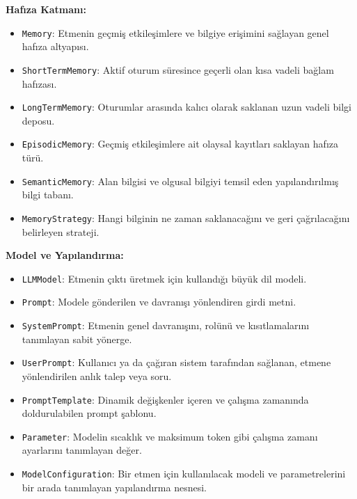 \documentclass[10pt, a4paper, twocolumn]{article}
\begin{document}
\textbf{Hafıza Katmanı:}
\begin{itemize}
    \item \texttt{Memory}: Etmenin geçmiş etkileşimlere ve bilgiye erişimini sağlayan genel hafıza altyapısı.
    \item \texttt{ShortTermMemory}: Aktif oturum süresince geçerli olan kısa vadeli bağlam hafızası.
    \item \texttt{LongTermMemory}: Oturumlar arasında kalıcı olarak saklanan uzun vadeli bilgi deposu.
    \item \texttt{EpisodicMemory}: Geçmiş etkileşimlere ait olaysal kayıtları saklayan hafıza türü.
    \item \texttt{SemanticMemory}: Alan bilgisi ve olgusal bilgiyi temsil eden yapılandırılmış bilgi tabanı.
    \item \texttt{MemoryStrategy}: Hangi bilginin ne zaman saklanacağını ve geri çağrılacağını belirleyen strateji.
\end{itemize}

\textbf{Model ve Yapılandırma:}
\begin{itemize}
    \item \texttt{LLMModel}: Etmenin çıktı üretmek için kullandığı büyük dil modeli.
    \item \texttt{Prompt}: Modele gönderilen ve davranışı yönlendiren girdi metni.
    \item \texttt{SystemPrompt}: Etmenin genel davranışını, rolünü ve kısıtlamalarını tanımlayan sabit yönerge.
    \item \texttt{UserPrompt}: Kullanıcı ya da çağıran sistem tarafından sağlanan, etmene yönlendirilen anlık talep veya soru.
    \item \texttt{PromptTemplate}: Dinamik değişkenler içeren ve çalışma zamanında doldurulabilen prompt şablonu.
    \item \texttt{Parameter}: Modelin sıcaklık ve maksimum token gibi çalışma zamanı ayarlarını tanımlayan değer.
    \item \texttt{ModelConfiguration}: Bir etmen için kullanılacak modeli ve parametrelerini bir arada tanımlayan yapılandırma nesnesi.
\end{itemize}
\end{document}
